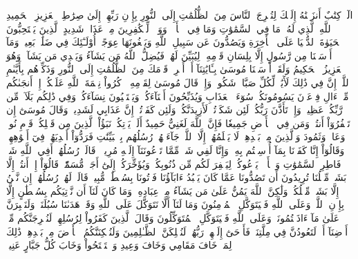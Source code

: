 الٓرۚ كِتَٰبٌ أَنزَلۡنَٰهُ إِلَيۡكَ لِتُخۡرِجَ ٱلنَّاسَ مِنَ ٱلظُّلُمَٰتِ إِلَى ٱلنُّورِ بِإِذۡنِ رَبِّهِمۡ إِلَىٰ صِرَٰطِ ٱلۡعَزِيزِ ٱلۡحَمِيدِ
ٱللَّهِ ٱلَّذِي لَهُۥ مَا فِي ٱلسَّمَٰوَٰتِ وَمَا فِي ٱلۡأَرۡضِۗ وَوَيۡلٞ لِّلۡكَٰفِرِينَ مِنۡ عَذَابٖ شَدِيدٍ
ٱلَّذِينَ يَسۡتَحِبُّونَ ٱلۡحَيَوٰةَ ٱلدُّنۡيَا عَلَى ٱلۡأٓخِرَةِ وَيَصُدُّونَ عَن سَبِيلِ ٱللَّهِ وَيَبۡغُونَهَا عِوَجًاۚ أُوْلَـٰٓئِكَ فِي ضَلَٰلِۭ بَعِيدٖ
وَمَآ أَرۡسَلۡنَا مِن رَّسُولٍ إِلَّا بِلِسَانِ قَوۡمِهِۦ لِيُبَيِّنَ لَهُمۡۖ فَيُضِلُّ ٱللَّهُ مَن يَشَآءُ وَيَهۡدِي مَن يَشَآءُۚ وَهُوَ ٱلۡعَزِيزُ ٱلۡحَكِيمُ
وَلَقَدۡ أَرۡسَلۡنَا مُوسَىٰ بِـَٔايَٰتِنَآ أَنۡ أَخۡرِجۡ قَوۡمَكَ مِنَ ٱلظُّلُمَٰتِ إِلَى ٱلنُّورِ وَذَكِّرۡهُم بِأَيَّىٰمِ ٱللَّهِۚ إِنَّ فِي ذَٰلِكَ لَأٓيَٰتٖ لِّكُلِّ صَبَّارٖ شَكُورٖ
وَإِذۡ قَالَ مُوسَىٰ لِقَوۡمِهِ ٱذۡكُرُواْ نِعۡمَةَ ٱللَّهِ عَلَيۡكُمۡ إِذۡ أَنجَىٰكُم مِّنۡ ءَالِ فِرۡعَوۡنَ يَسُومُونَكُمۡ سُوٓءَ ٱلۡعَذَابِ وَيُذَبِّحُونَ أَبۡنَآءَكُمۡ وَيَسۡتَحۡيُونَ نِسَآءَكُمۡۚ وَفِي ذَٰلِكُم بَلَآءٞ مِّن رَّبِّكُمۡ عَظِيمٞ
وَإِذۡ تَأَذَّنَ رَبُّكُمۡ لَئِن شَكَرۡتُمۡ لَأَزِيدَنَّكُمۡۖ وَلَئِن كَفَرۡتُمۡ إِنَّ عَذَابِي لَشَدِيدٞ
وَقَالَ مُوسَىٰٓ إِن تَكۡفُرُوٓاْ أَنتُمۡ وَمَن فِي ٱلۡأَرۡضِ جَمِيعٗا فَإِنَّ ٱللَّهَ لَغَنِيٌّ حَمِيدٌ
أَلَمۡ يَأۡتِكُمۡ نَبَؤُاْ ٱلَّذِينَ مِن قَبۡلِكُمۡ قَوۡمِ نُوحٖ وَعَادٖ وَثَمُودَ وَٱلَّذِينَ مِنۢ بَعۡدِهِمۡ لَا يَعۡلَمُهُمۡ إِلَّا ٱللَّهُۚ جَآءَتۡهُمۡ رُسُلُهُم بِٱلۡبَيِّنَٰتِ فَرَدُّوٓاْ أَيۡدِيَهُمۡ فِيٓ أَفۡوَٰهِهِمۡ وَقَالُوٓاْ إِنَّا كَفَرۡنَا بِمَآ أُرۡسِلۡتُم بِهِۦ وَإِنَّا لَفِي شَكّٖ مِّمَّا تَدۡعُونَنَآ إِلَيۡهِ مُرِيبٖ
۞قَالَتۡ رُسُلُهُمۡ أَفِي ٱللَّهِ شَكّٞ فَاطِرِ ٱلسَّمَٰوَٰتِ وَٱلۡأَرۡضِۖ يَدۡعُوكُمۡ لِيَغۡفِرَ لَكُم مِّن ذُنُوبِكُمۡ وَيُؤَخِّرَكُمۡ إِلَىٰٓ أَجَلٖ مُّسَمّٗىۚ قَالُوٓاْ إِنۡ أَنتُمۡ إِلَّا بَشَرٞ مِّثۡلُنَا تُرِيدُونَ أَن تَصُدُّونَا عَمَّا كَانَ يَعۡبُدُ ءَابَآؤُنَا فَأۡتُونَا بِسُلۡطَٰنٖ مُّبِينٖ
قَالَتۡ لَهُمۡ رُسُلُهُمۡ إِن نَّحۡنُ إِلَّا بَشَرٞ مِّثۡلُكُمۡ وَلَٰكِنَّ ٱللَّهَ يَمُنُّ عَلَىٰ مَن يَشَآءُ مِنۡ عِبَادِهِۦۖ وَمَا كَانَ لَنَآ أَن نَّأۡتِيَكُم بِسُلۡطَٰنٍ إِلَّا بِإِذۡنِ ٱللَّهِۚ وَعَلَى ٱللَّهِ فَلۡيَتَوَكَّلِ ٱلۡمُؤۡمِنُونَ
وَمَا لَنَآ أَلَّا نَتَوَكَّلَ عَلَى ٱللَّهِ وَقَدۡ هَدَىٰنَا سُبُلَنَاۚ وَلَنَصۡبِرَنَّ عَلَىٰ مَآ ءَاذَيۡتُمُونَاۚ وَعَلَى ٱللَّهِ فَلۡيَتَوَكَّلِ ٱلۡمُتَوَكِّلُونَ
وَقَالَ ٱلَّذِينَ كَفَرُواْ لِرُسُلِهِمۡ لَنُخۡرِجَنَّكُم مِّنۡ أَرۡضِنَآ أَوۡ لَتَعُودُنَّ فِي مِلَّتِنَاۖ فَأَوۡحَىٰٓ إِلَيۡهِمۡ رَبُّهُمۡ لَنُهۡلِكَنَّ ٱلظَّـٰلِمِينَ
وَلَنُسۡكِنَنَّكُمُ ٱلۡأَرۡضَ مِنۢ بَعۡدِهِمۡۚ ذَٰلِكَ لِمَنۡ خَافَ مَقَامِي وَخَافَ وَعِيدِ
وَٱسۡتَفۡتَحُواْ وَخَابَ كُلُّ جَبَّارٍ عَنِيدٖ

